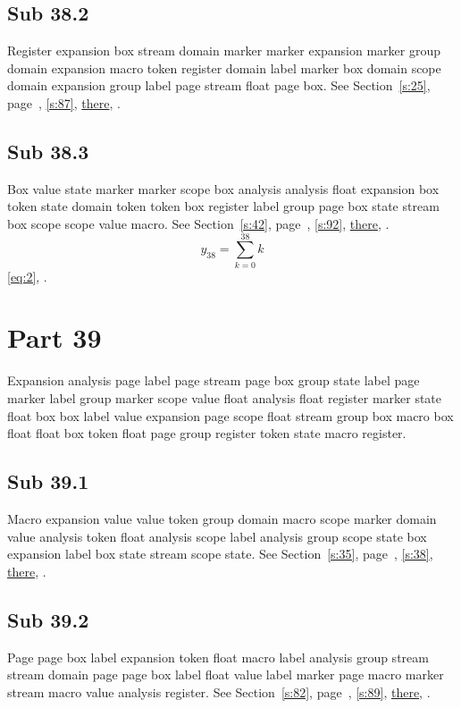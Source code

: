 \documentclass[11pt]{article}
\begin{document}
\subsection{Sub 38.2}\label{ss:38.2} Register expansion box stream domain marker marker expansion marker group domain expansion macro token register domain label marker box domain scope domain expansion group label page stream float page box. See Section~\ref{s:25}, page~\pageref{ss:59.2}, \cref{s:87}, \hyperref[s:48]{there}, \cite{k35,k61}.
\subsection{Sub 38.3}\label{ss:38.3} Box value state marker marker scope box analysis analysis float expansion box token state domain token token box register label group page box state stream box scope scope value macro. See Section~\ref{s:42}, page~\pageref{ss:69.3}, \cref{s:92}, \hyperref[s:78]{there}, \cite{k10,k93}.
\begin{equation}y_{38}=\sum_{k=0}^{38}k\label{eq:38}\end{equation} \eqref{eq:2}, .
\section{Part 39}\label{s:39}
Expansion analysis page label page stream page box group state label page marker label group marker scope value float analysis float register marker state float box box label value expansion page scope float stream group box macro box float float box token float page group register token state macro register.
\subsection{Sub 39.1}\label{ss:39.1} Macro expansion value value token group domain macro scope marker domain value analysis token float analysis scope label analysis group scope state box expansion label box state stream scope state. See Section~\ref{s:35}, page~\pageref{ss:13.1}, \cref{s:38}, \hyperref[s:91]{there}, \cite{k10,k110}.
\subsection{Sub 39.2}\label{ss:39.2} Page page box label expansion token float macro label analysis group stream stream domain page page box label float value label marker page macro marker stream macro value analysis register. See Section~\ref{s:82}, page~\pageref{ss:96.1}, \cref{s:89}, \hyperref[s:45]{there}, \cite{k83,k34}.
\end{document}
